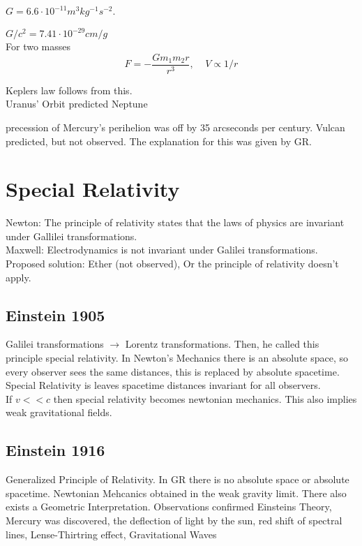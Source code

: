 \documentclass[]{scrartcl}
\begin{document}
$G = 6.6\cdot 10^{-11} m^3 kg^{-1} s^{-2}$. 

$G/c^2 = 7.41 \cdot 10^{-29} cm/g$\\
For two masses
$$
F = -\frac{Gm_1m_2 r}{r^3},\;\;\;\; V\propto 1/r
$$

Keplers law follows from this.\\
Uranus' Orbit predicted Neptune

precession of Mercury's perihelion was off by 35 arcseconds per century. Vulcan predicted, but not observed. The explanation for this was given by GR.

\section{Special Relativity}
Newton: The principle of relativity states that the laws of physics are invariant under Gallilei transformations.\\
Maxwell: Electrodynamics is not invariant under Galilei transformations. Proposed solution: Ether (not observed), Or the principle of relativity doesn't apply.\\

\subsection{Einstein 1905}
Galilei transformations $\longrightarrow$ Lorentz transformations. Then, he called this principle special relativity. In Newton's Mechanics there is an absolute space, so every observer sees the same distances, this is replaced by absolute spacetime. Special Relativity is leaves spacetime distances invariant for all observers.\\
If $v << c$ then special relativity becomes newtonian mechanics. This also implies weak gravitational fields.

\subsection{Einstein 1916}
Generalized Principle of Relativity. In GR there is no absolute space or absolute spacetime. Newtonian Mehcanics obtained in the weak gravity limit. There also exists a Geometric Interpretation. Observations confirmed Einsteins Theory, Mercury was discovered, the deflection of light by the sun, red shift of spectral lines, Lense-Thirtring effect, Gravitational Waves
\end{document}
